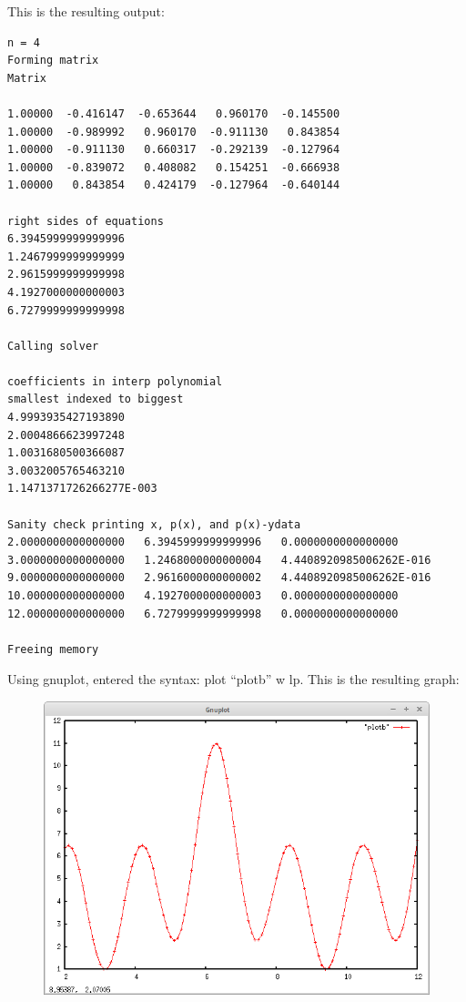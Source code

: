\documentclass[12pt]{article}
\begin{document}
This is the resulting output:

\begin{verbatim}
n = 4
Forming matrix
Matrix

1.00000  -0.416147  -0.653644   0.960170  -0.145500
1.00000  -0.989992   0.960170  -0.911130   0.843854
1.00000  -0.911130   0.660317  -0.292139  -0.127964
1.00000  -0.839072   0.408082   0.154251  -0.666938
1.00000   0.843854   0.424179  -0.127964  -0.640144

right sides of equations
6.3945999999999996
1.2467999999999999
2.9615999999999998
4.1927000000000003
6.7279999999999998

Calling solver

coefficients in interp polynomial
smallest indexed to biggest
4.9993935427193890
2.0004866623997248
1.0031680500366087
3.0032005765463210
1.1471371726266277E-003

Sanity check printing x, p(x), and p(x)-ydata
2.0000000000000000   6.3945999999999996   0.0000000000000000
3.0000000000000000   1.2468000000000004   4.4408920985006262E-016
9.0000000000000000   2.9616000000000002   4.4408920985006262E-016
10.000000000000000   4.1927000000000003   0.0000000000000000
12.000000000000000   6.7279999999999998   0.0000000000000000

Freeing memory
\end{verbatim}

Using gnuplot, entered the syntax: plot ``plotb'' w lp. This is the resulting graph:

\begin{figure}
	\centering
		\includegraphics[width=1.00\textwidth]{interpGraph.png}
	\label{fig:interpGraph}
\end{figure}
\end{document}

